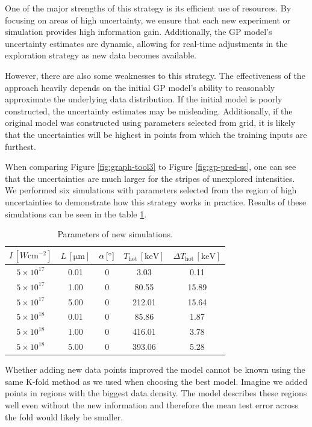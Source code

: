 One of the major strengths of this strategy is its efficient use of resources. By focusing on areas of high uncertainty, we ensure that each new experiment or simulation provides high information gain. Additionally, the GP model's uncertainty estimates are dynamic, allowing for real-time adjustments in the exploration strategy as new data becomes available. 

However, there are also some weaknesses to this strategy. The effectiveness of the approach heavily depends on the initial GP model's ability to reasonably approximate the underlying data distribution. If the initial model is poorly constructed, the uncertainty estimates may be misleading. Additionally, if the original model was constructed using parameters selected from grid, it is likely that the uncertainties will be highest in points from which the training inputs are furthest.

When comparing Figure \ref{fig:graph-tool3} to Figure \ref{fig:gp-pred-ss}, one can see that the uncertainties are much larger for the stripes of unexplored intensities. We performed six simulations with parameters selected from the region of high uncertainties to demonstrate how this strategy works in practice. Results of these simulations can be seen in the table \ref{tab:new-simulations}.

\begin{table}[h]
	\centering
	\caption{Parameters of new simulations.}
	\begin{tabular}{c c c c c}
		\toprule
	     $I \, \left[W \mathrm{cm}^{-2}\right]$ & $L \, \mathrm{[\mu m]}$ & $\alpha \, \mathrm{[\degree]}$  & $T_\mathrm{hot} \, [\mathrm{keV}] $ &  $\Delta T_\mathrm{hot} \, [\mathrm{keV}]$ \\ 
		\midrule
		$5\times 10^{17}$ & 0.01 &0 &3.03 &0.11  \\
		$5\times 10^{17}$ & 1.00 &0 &80.55 & 15.89 \\
		$5\times 10^{17}$ & 5.00 &0 &212.01 & 15.64 \\
		$5\times 10^{18}$ & 0.01 &0 &85.86 & 1.87 \\
		$5\times 10^{18}$ & 1.00 &0 &416.01 & 3.78 \\
		$5\times 10^{18}$ & 5.00 &0 &393.06 & 5.28 \\
		\bottomrule
	\end{tabular}
	\label{tab:new-simulations}
\end{table}

Whether adding new data points improved the model cannot be known using the same K-fold method as we used when choosing the best model. Imagine we added points in regions with the biggest data density. The model describes these regions well even without the new information and therefore the mean test error across the fold would likely be smaller. 

